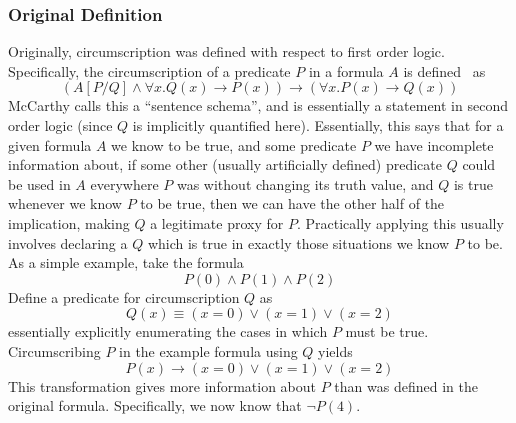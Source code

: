 \subsubsection{Original Definition}
Originally, circumscription was defined with respect to first order logic.
Specifically, the circumscription of a predicate $P$ in a formula $A$ is defined~\cite{circumscription} as
\[
(A [P/Q] \wedge \forall x. Q(x) \rightarrow P(x)) \rightarrow (\forall x. P(x) \rightarrow Q(x))
\]
McCarthy calls this a ``sentence schema'', and is essentially a statement in second order logic (since $Q$ is implicitly quantified here).
Essentially, this says that for a given formula $A$ we know to be true, and some predicate $P$ we have incomplete information about, if some other (usually artificially defined) predicate $Q$ could be used in $A$ everywhere $P$ was without changing its truth value, and $Q$ is true whenever we know $P$ to be true, then we can have the other half of the implication, making $Q$ a legitimate proxy for $P$.
Practically applying this usually involves declaring a $Q$ which is true in exactly those situations we know $P$ to be.
As a simple example, take the formula 
\[
        P(0) \wedge P(1) \wedge P(2)
\]
Define a predicate for circumscription $Q$ as
\[
        Q(x) \equiv (x = 0) \vee (x = 1) \vee (x = 2)
\]
essentially explicitly enumerating the cases in which $P$ must be true. 
Circumscribing $P$ in the example formula using $Q$ yields
\[
        P(x) \rightarrow (x = 0) \vee (x = 1) \vee (x = 2)
\]
This transformation gives more information about $P$ than was defined in the original formula.
Specifically, we now know that $\neg P(4)$.

